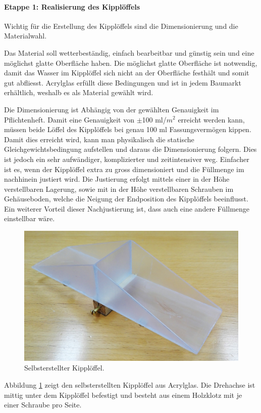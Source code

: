 \paragraph{Etappe 1: Realisierung des Kipplöffels}
Wichtig für die Erstellung des Kipplöffels sind die Dimensionierung und die Materialwahl.
 
Das Material soll wetterbeständig, einfach bearbeitbar und günstig sein und eine möglichst glatte Oberfläche haben. Die möglichst glatte Oberfläche ist notwendig, damit das Wasser im Kipplöffel sich nicht an der Oberfläche festhält und somit gut abfliesst. Acrylglas erfüllt diese Bedingungen und ist in jedem Baumarkt erhältlich, weshalb es als Material gewählt wird.

Die Dimensionierung ist Abhängig von der gewählten Genauigkeit im Pflichtenheft. Damit eine Genauigkeit von $\pm$100 ml/$m^2$ erreicht werden kann, müssen beide Löffel des Kipplöffels bei genau 100 ml Fassungsvermögen kippen. Damit dies erreicht wird, kann man physikalisch die statische Gleichgewichtsbedingung aufstellen und daraus die Dimensionierung folgern. Dies ist jedoch ein sehr aufwändiger, komplizierter und zeitintensiver weg. Einfacher ist es, wenn der Kipplöffel extra zu gross dimensioniert und die Füllmenge im nachhinein justiert wird. Die Justierung erfolgt mittels einer in der Höhe verstellbaren Lagerung, sowie mit in der Höhe verstellbaren Schrauben im Gehäuseboden, welche die Neigung der Endposition des Kipplöffels beeinflusst. Ein weiterer Vorteil dieser Nachjustierung ist, dass auch eine andere Füllmenge einstellbar wäre.

\begin{figure}[h]
\centering
\includegraphics[width=0.8\linewidth]{graphics/Etappe1.jpg}
\caption{Selbsterstellter Kipplöffel.}
\label{fig:Etappe1}
\end{figure}

Abbildung \ref{fig:Etappe1} zeigt den selbsterstellten Kipplöffel aus Acrylglas. Die Drehachse ist mittig unter dem Kipplöffel befestigt und besteht aus einem Holzklotz mit je einer Schraube pro Seite.


